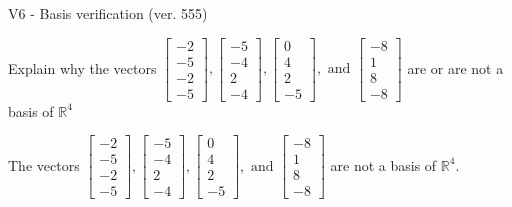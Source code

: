 \begin{exercise}
  \begin{exerciseTitle}V6 - Basis verification (ver. 555)\end{exerciseTitle}
  \begin{exerciseStatement}
    Explain why the vectors \(\left[\begin{array}{r}
-2 \\
-5 \\
-2 \\
-5
\end{array}\right] , \left[\begin{array}{r}
-5 \\
-4 \\
2 \\
-4
\end{array}\right] , \left[\begin{array}{r}
0 \\
4 \\
2 \\
-5
\end{array}\right] , \text{ and } \left[\begin{array}{r}
-8 \\
1 \\
8 \\
-8
\end{array}\right]\) are or are not a basis of \(\mathbb{R}^4\)	


  \end{exerciseStatement}
  \begin{exerciseAnswer}
   The vectors \(\left[\begin{array}{r}
-2 \\
-5 \\
-2 \\
-5
\end{array}\right] , \left[\begin{array}{r}
-5 \\
-4 \\
2 \\
-4
\end{array}\right] , \left[\begin{array}{r}
0 \\
4 \\
2 \\
-5
\end{array}\right] , \text{ and } \left[\begin{array}{r}
-8 \\
1 \\
8 \\
-8
\end{array}\right]\) 
  	 are not  a basis of \(\mathbb{R}^4\).
  


  \end{exerciseAnswer}
\end{exercise}